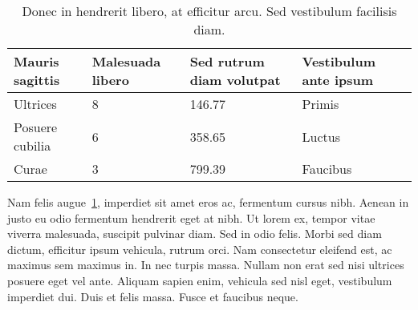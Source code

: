\begin{center}
	\begin{table}[h]
		\caption{Donec in hendrerit libero, at efficitur arcu. Sed vestibulum facilisis diam.}
		\label{goodCatOrNot}
		\centering
		\begin{tabular}{|l|l|l|l|}
			\hline
			Mauris sagittis &  Malesuada libero & Sed rutrum diam volutpat & Vestibulum ante ipsum \\
			\hline
			Ultrices	&  8 & 146.77 & Primis\\ 
			\hline
			Posuere cubilia	& 6 & 358.65 & Luctus \\ 
			\hline
			Curae	&  3 & 799.39 & Faucibus \\ 
			\hline
		\end{tabular}
	\end{table}
\end{center}

Nam felis augue~\ref*{goodCatOrNot}, imperdiet sit amet eros ac, fermentum cursus nibh. Aenean in justo eu odio fermentum hendrerit eget at nibh. Ut lorem ex, tempor vitae viverra malesuada, suscipit pulvinar diam. Sed in odio felis. Morbi sed diam dictum, efficitur ipsum vehicula, rutrum orci. Nam consectetur eleifend est, ac maximus sem maximus in. In nec turpis massa. Nullam non erat sed nisi ultrices posuere eget vel ante. Aliquam sapien enim, vehicula sed nisl eget, vestibulum imperdiet dui. Duis et felis massa. Fusce et faucibus neque. 